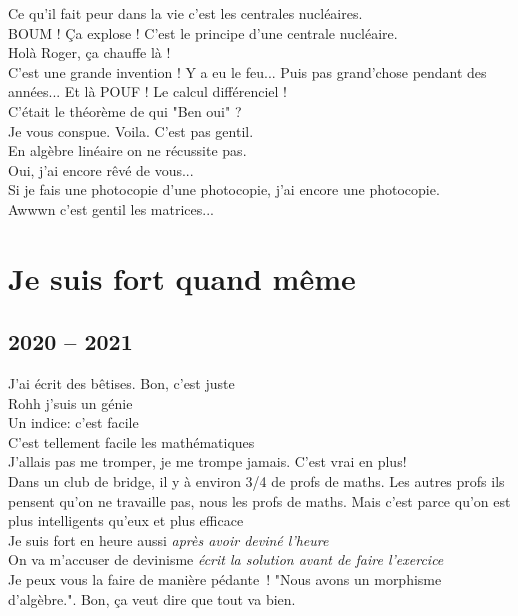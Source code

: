 \documentclass[french, a4paper, openany]{book}
\begin{document}
	\noindent \og Ce qu'il fait peur dans la vie c'est les centrales nucléaires. \fg \\
	\og BOUM ! Ça explose ! C'est le principe d'une centrale nucléaire. \fg \\
	\og Holà Roger, ça chauffe là ! \fg \\
	\og C'est une grande invention ! Y a eu le feu... Puis pas grand'chose pendant des années... Et là POUF ! Le calcul différenciel ! \fg \\
	\og C'était le théorème de qui "Ben oui" ? \fg \\
	\og Je vous conspue. Voila. C'est pas gentil. \fg \\
	\og En algèbre linéaire on ne récussite pas. \fg \\
	\og Oui, j'ai encore rêvé de vous... \fg \\
	\og Si je fais une photocopie d'une photocopie, j'ai encore une photocopie. \fg \\
	\og Awwwn c'est gentil les matrices... \fg \\

\chapter{Je suis fort quand même}

\section{2020 -- 2021}

	\noindent \og J'ai écrit des bêtises. Bon, c'est juste \fg \\
	\og Rohh j'suis un génie \fg \\
	\og Un indice: c'est facile \fg \\
	\og C'est tellement facile les mathématiques \fg \\
	\og J'allais pas me tromper, je me trompe jamais. C'est vrai en plus! \fg \\
	\og Dans un club de bridge, il y à environ 3/4 de profs de maths. Les autres profs ils pensent qu'on ne travaille pas, nous les profs de maths. Mais c'est parce qu'on est plus intelligents qu'eux et plus efficace \fg \\
	\og Je suis fort en heure aussi \fg \emph{après avoir deviné l'heure} \\
	\og On va m'accuser de devinisme \fg \emph{écrit la solution avant de faire l'exercice} \\
	\og Je peux vous la faire de manière pédante~! "Nous avons un morphisme d'algèbre.". Bon, ça veut dire que tout va bien. \fg \\
	
\end{document}
